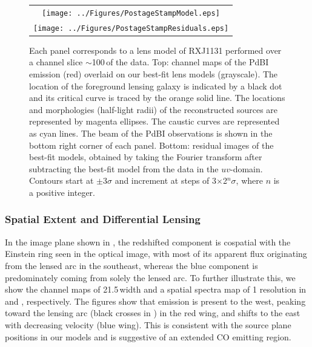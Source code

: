 \documentclass[]{emulateapj}
\begin{document}
\begin{figure}[tbph]
\centering
\begin{tabular}{c}
\texttt{[image: ../Figures/PostageStampModel.eps]} \\
\texttt{[image: ../Figures/PostageStampResiduals.eps]}
\end{tabular}
\caption{Each panel corresponds to a lens model of RXJ1131 performed over a
channel slice $\sim$100\,\kms of the \bco data. Top: channel maps of the
PdBI \bco emission (red) overlaid on our best-fit lens models (grayscale).
The location of the foreground lensing galaxy is indicated by a black dot and
its critical curve is traced by the orange solid line. The locations and
morphologies (half-light radii) of the reconstructed sources are
represented by magenta ellipses.
The caustic curves are represented as cyan lines. The beam of the
PdBI observations is shown in the bottom right corner of each panel.
Bottom: residual images of the best-fit models, obtained by
taking the Fourier transform after subtracting the best-fit model from the
data in the $uv$-domain. Contours start
at $\pm$3$\sigma$ and increment at steps of 3$\times$2$^n\sigma$,
where $n$ is a positive integer.
\label{fig:model}}
\end{figure}

\subsubsection{Spatial Extent and Differential Lensing} \label{sec:differential}
In the image plane shown in  , the redshifted component is
cospatial with the Einstein ring seen in the
optical image, with most of its apparent flux originating from the lensed arc
in the southeast, whereas the blue component is predominately coming from
solely the lensed arc. To further illustrate this, we show the
channel maps of 21.5\,\kms width and a spatial spectra map of 1 resolution in
 and , respectively. The figures
show that emission
is present to the west, peaking toward the lensing arc (black crosses in
) in the red wing, and shifts to the east with decreasing velocity
(blue wing).
This is consistent with the source plane positions in our models and
is suggestive of an extended CO emitting region.
\end{document}
